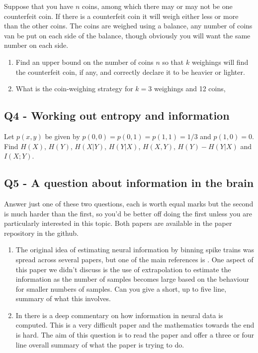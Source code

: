 \documentclass[12pt]{article}
\begin{document}
Suppose that you have $n$ coins, among which there may or may not be
one counterfeit coin. If there is a counterfeit coin it will weigh
either less or more than the other coins. The coins are weighed using
a balance, any number of coins van be put on each side of the balance,
though obviously you will want the same number on each side.
\begin{enumerate}
\item Find an upper bound on the number of coins $n$ so that $k$
  weighings will find the counterfeit coin, if any, and correctly
  declare it to be heavier or lighter.
\item What is the coin-weighing strategy for $k=3$ weighings and 12
  coins,
\end{enumerate}

\subsection*{Q4 - Working out entropy and information}

Let $p(x,y)$ be given by $p(0,0)=p(0,1)=p(1,1)=1/3$ and
$p(1,0)=0$. Find $H(X)$, $H(Y)$, $H(X|Y)$, $H(Y|X)$, $H(X,Y)$,
$H(Y)-H(Y|X)$ and $I(X;Y)$.

\subsection*{Q5 - A question about information in the brain}

Answer just one of these two questions, each is worth equal marks but the
second is much harder than the first, so you'd be better off doing the
first unless you are particularly interested in this topic. Both papers are available in the paper repository in the github.

\begin{enumerate}
\item The original idea of estimating neural information by binning
  spike trains was spread across several papers, but one of the main
  references is \cite{StrongEtAl1998}. One aspect of this paper we
  didn't discuss is the use of extrapolation to estimate the
  information as the number of samples becomes large based on the
  behaviour for smaller numbers of samples. Can you give a short, up
  to five line, summary of what this involves.

\item In \cite{NemenmanEtAl2004} there is a deep commentary on how
  information in neural data is computed. This is a very difficult
  paper and the mathematics towards the end is hard. The aim of this
  question is to read the paper and offer a three or four line overall
  summary of what the paper is trying to do.
\end{enumerate}


{}
\end{document}
